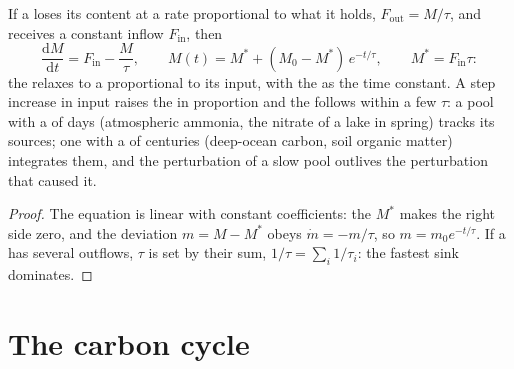 \begin{theorem}\label{thm:b2:biogeochemical-cycles:box}
If a  loses its content at a rate proportional to what it
holds, $F_{\text{out}} = M/\tau$, and receives a constant inflow
$F_{\text{in}}$, then
\[
\frac{\mathrm{d}M}{\mathrm{d}t} = F_{\text{in}} - \frac{M}{\tau},
\qquad
M(t) = M^{*} + (M_0 - M^{*})\,e^{-t/\tau}, \qquad M^{*} = F_{\text{in}}\tau :
\]
the  relaxes to a  proportional to its input,
with the  as the time constant. A step increase in
input raises the  in proportion and the 
follows within a few $\tau$: a pool with a  of days
(atmospheric ammonia, the nitrate of a lake in spring) tracks its
sources; one with a  of centuries (deep-ocean carbon,
soil organic matter) integrates them, and the perturbation of a
slow pool outlives the perturbation that caused it.
\end{theorem}
\begin{proof}
The equation is linear with constant coefficients: the 
$M^{*}$ makes the right side zero, and the deviation $m = M - M^{*}$
obeys $\dot m = -m/\tau$, so $m = m_0 e^{-t/\tau}$. If a 
has several outflows, $\tau$ is set by their sum, $1/\tau = \sum_i
1/\tau_i$: the fastest sink dominates.
\end{proof}

\section{The carbon cycle}

